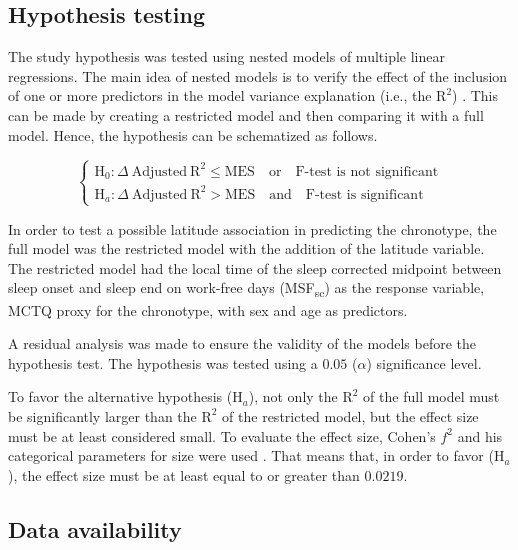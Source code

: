\documentclass[
12pt,
openright,
oneside,
a4paper,
chapter=TITLE,
section=TITLE,
french,
spanish,
brazil,
english
]{abntex2}\usepackage{array}
\begin{document}
\subsection{Hypothesis testing}\label{hypothesis-testing}

The study hypothesis was tested using nested models of multiple linear
regressions. The main idea of nested models is to verify the effect of
the inclusion of one or more predictors in the model variance
explanation (i.e., the \(\text{R}^{2}\)) \autocite{allen1997}. This can
be made by creating a restricted model and then comparing it with a full
model. Hence, the hypothesis can be schematized as follows.

\[
\begin{cases}
\text{H}_{0}: \Delta \ \text{Adjusted} \ \text{R}^{2} \leq \text{MES} \quad \text{or} \quad \text{F-test is not significant} \\
\text{H}_{a}: \Delta \ \text{Adjusted} \ \text{R}^{2} > \text{MES} \quad \text{and} \quad \text{F-test is significant}
\end{cases}
\]

\smallskip

In order to test a possible latitude association in predicting the
chronotype, the full model was the restricted model with the addition of
the latitude variable. The restricted model had the local time of the
sleep corrected midpoint between sleep onset and sleep end on work-free
days (MSF\textsubscript{sc}) as the response variable, MCTQ proxy for
the chronotype, with sex and age as predictors.

A residual analysis was made to ensure the validity of the models before
the hypothesis test. The hypothesis was tested using a \(0.05\)
(\(\alpha\)) significance level.

To favor the alternative hypothesis (\(\text{H}_{a}\)), not only the
\(\text{R}^{2}\) of the full model must be significantly larger than the
\(\text{R}^{2}\) of the restricted model, but the effect size must be at
least considered small. To evaluate the effect size, Cohen's \(f^{2}\)
and his categorical parameters for size were used \autocite{cohen1992}.
That means that, in order to favor (\(\text{H}_{a}\)), the effect size
must be at least equal to or greater than \(0.0219\).

\subsection{Data availability}\label{data-availability}
\end{document}
